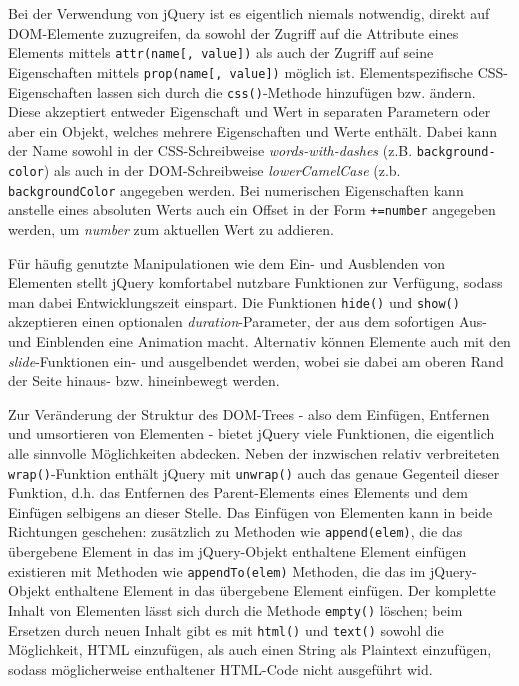 \begin{description}
Bei der Verwendung von jQuery ist es eigentlich niemals notwendig, direkt auf DOM-Elemente
zuzugreifen, da sowohl der Zugriff auf die Attribute eines Elements mittels
\lstinline{attr(name[, value])} als auch der Zugriff auf seine Eigenschaften mittels
\lstinline{prop(name[, value])} möglich ist.
Elementspezifische CSS-Eigenschaften lassen sich durch die \lstinline{css()}-Methode hinzufügen bzw.
ändern. Diese akzeptiert entweder Eigenschaft und Wert in separaten Parametern oder aber ein Objekt,
welches mehrere Eigenschaften und Werte enthält. Dabei kann der Name sowohl in der CSS-Schreibweise
\emph{words-with-dashes} (z.B. \lstinline{background-color}) als auch in der DOM-Schreibweise
\emph{lowerCamelCase} (z.b. \lstinline{backgroundColor} angegeben werden. Bei numerischen
Eigenschaften kann anstelle eines absoluten Werts auch ein Offset in der Form \lstinline{+=number}
angegeben werden, um \emph{number} zum aktuellen Wert zu addieren.

Für häufig genutzte Manipulationen wie dem Ein- und Ausblenden von Elementen stellt jQuery
komfortabel nutzbare Funktionen zur Verfügung, sodass man dabei Entwicklungszeit einspart. Die
Funktionen \lstinline{hide()} und \lstinline{show()} akzeptieren einen optionalen
\emph{duration}-Parameter, der aus dem sofortigen Aus- und Einblenden eine Animation macht.
Alternativ können Elemente auch mit den \emph{slide}-Funktionen ein- und ausgelbendet werden, wobei
sie dabei am oberen Rand der Seite hinaus- bzw. hineinbewegt werden.

Zur Veränderung der Struktur des DOM-Trees - also dem Einfügen, Entfernen und umsortieren von
Elementen - bietet jQuery viele Funktionen, die eigentlich alle sinnvolle Möglichkeiten abdecken.
Neben der inzwischen relativ verbreiteten \lstinline{wrap()}-Funktion enthält jQuery mit
\lstinline{unwrap()} auch das genaue Gegenteil dieser Funktion, d.h. das Entfernen des
Parent-Elements eines Elements und dem Einfügen selbigens an dieser Stelle. Das Einfügen von
Elementen kann in beide Richtungen geschehen: zusätzlich zu Methoden wie \lstinline{append(elem)},
die das übergebene Element in das im jQuery-Objekt enthaltene Element einfügen existieren mit
Methoden wie \lstinline{appendTo(elem)} Methoden, die das im jQuery-Objekt enthaltene Element in das
übergebene Element einfügen. Der komplette Inhalt von Elementen lässt sich durch die Methode
\lstinline{empty()} löschen; beim Ersetzen durch neuen Inhalt gibt es mit \lstinline{html()} und
\lstinline{text()} sowohl die Möglichkeit, HTML einzufügen, als auch einen String als Plaintext
einzufügen, sodass möglicherweise enthaltener HTML-Code nicht ausgeführt wid.


\end{description}
